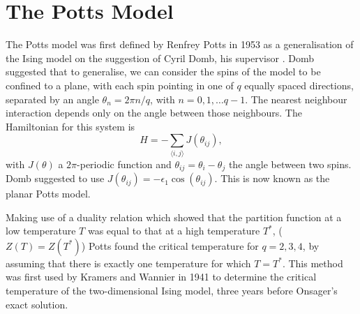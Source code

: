 \documentclass[11pt, a4paper]{report} %
\begin{document}
\section{The Potts Model}
The Potts model was first defined by Renfrey Potts in 1953 as a generalisation of the Ising model on the suggestion of Cyril Domb, his supervisor \cite{potts:1952}.
Domb suggested that to generalise, we can consider the spins of the model to be confined to a plane, with each spin pointing in one of \(q\) equally spaced directions, separated by an angle \(\theta_n = 2\pi n /q\), with \(n = 0, 1, \ldots q - 1\).
The nearest neighbour interaction depends only on the angle between those neighbours.
The Hamiltonian for this system is
\begin{equation}
	H = - \sum_{\langle i, j \rangle} J(\theta_{ij}),
\end{equation}
with \(J(\theta)\) a \(2\pi\)-periodic function and \(\theta_{ij} = \theta_i - \theta_j\) the angle between two spins.
Domb suggested to use \(J(\theta_{ij}) = - \epsilon_1\cos(\theta_{ij})\).
This is now known as the planar Potts model.\cite{wu:1982}

Making use of a duality relation which showed that the partition function at a low temperature \(T\) was equal to that at a high temperature \(T^*\), (\(Z(T)=Z(T^*)\)) Potts found the critical temperature for \(q=2, 3, 4\), by assuming that there is exactly one temperature for which \(T=T^*\).
This method was first used by Kramers and Wannier in 1941 \cite{kramers:1941} to determine the critical temperature of the two-dimensional Ising model, three years before Onsager's exact solution.
\end{document}
